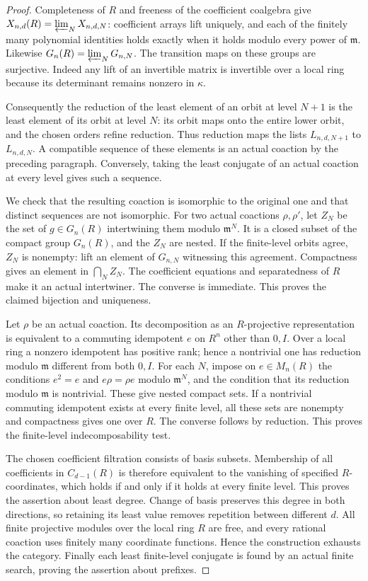 \begin{proof}
Completeness of $R$ and freeness of the coefficient
coalgebra give
$X_{n,d}(R)=\varprojlim_N X_{n,d,N}$: coefficient
arrays lift uniquely, and each of the finitely many
polynomial identities holds exactly when it holds
modulo every power of $\mathfrak m$.
Likewise
$G_n(R)=\varprojlim_NG_{n,N}$.
The transition maps on these groups are surjective.
Indeed any lift of an invertible matrix is invertible
over a local ring because its determinant remains
nonzero in $\kappa$.

Consequently the reduction of the least element of
an orbit at level $N+1$ is the least element of its
orbit at level $N$: its orbit maps onto the entire
lower orbit, and the chosen orders refine reduction.
Thus reduction maps the lists $L_{n,d,N+1}$ to
$L_{n,d,N}$. A compatible sequence of these elements
is an actual coaction by the preceding paragraph.
Conversely, taking the least conjugate of an actual
coaction at every level gives such a sequence.

We check that the resulting coaction is isomorphic
to the original one and that distinct sequences are
not isomorphic. For two actual coactions $\rho,\rho'$,
let $Z_N$ be the set of $g\in G_n(R)$ intertwining
them modulo $\mathfrak m^N$. It is a closed subset
of the compact group $G_n(R)$, and the $Z_N$ are nested.
If the finite-level orbits agree, $Z_N$ is nonempty:
lift an element of $G_{n,N}$ witnessing this agreement.
Compactness gives an element in $\bigcap_N Z_N$.
The coefficient equations and separatedness of $R$
make it an actual intertwiner. The converse is immediate.
This proves the claimed bijection and uniqueness.

Let $\rho$ be an actual coaction.
Its decomposition as an $R$-projective representation
is equivalent to a commuting idempotent $e$ on $R^n$
other than $0,I$. Over a local ring a nonzero
idempotent has positive rank; hence a nontrivial one
has reduction modulo $\mathfrak m$ different from
both $0,I$. For each $N$, impose on $e\in M_n(R)$
the conditions $e^2=e$ and $e\rho=\rho e$ modulo
$\mathfrak m^N$, and the condition that its reduction
modulo $\mathfrak m$ is nontrivial.
These give nested compact sets. If a nontrivial
commuting idempotent exists at every finite level,
all these sets are nonempty and compactness gives
one over $R$. The converse follows by reduction.
This proves the finite-level indecomposability test.

The chosen coefficient filtration consists of basis
subsets. Membership of all coefficients in
$C_{d-1}(R)$ is therefore equivalent to the vanishing
of specified $R$-coordinates, which holds if and
only if it holds at every finite level. This proves
the assertion about least degree. Change of basis
preserves this degree in both directions, so retaining
its least value removes repetition between different
$d$. All finite projective modules over the local
ring $R$ are free, and every rational coaction uses
finitely many coordinate functions. Hence the
construction exhausts the category.
Finally each least finite-level conjugate is found
by an actual finite search, proving the assertion
about prefixes.
\end{proof}

